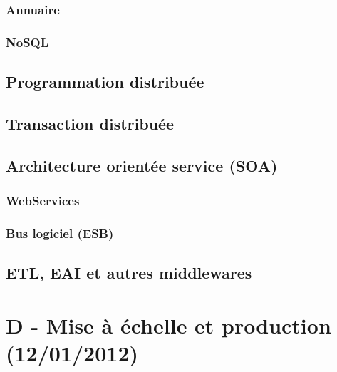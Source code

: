 \subsubsection{Annuaire}
\subsubsection{NoSQL}
\subsection{Programmation distribuée}
\subsection{Transaction distribuée}
\subsection{Architecture orientée service (SOA)}
\subsubsection{WebServices}

\subsubsection{Bus logiciel (ESB)}
\subsection{ETL, EAI et autres middlewares}

\section{D - Mise à échelle et production (12/01/2012)}

